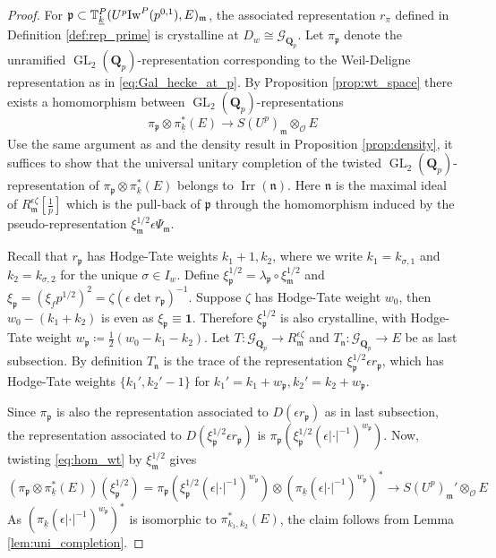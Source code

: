\documentclass[leqno]{amsart}
\theoremstyle{definition}
\theoremstyle{remark}
\newcommand{\id}{\mathbf{1}}
\newcommand{\oo}{\mathcal{O}}
\newcommand{\Qp}{\mathbf{Q}_p}
\DeclareMathOperator{\GL}{GL}
\newcommand{\fm}{\mathfrak{m}}
\newcommand{\fn}{\mathfrak{n}}
\newcommand{\fp}{\mathfrak{p}}
\DeclareMathOperator{\Irr}{Irr}
\newcommand{\Gp}{\mathcal{G}_{\Qp}} %
\newcommand{\wt}[1]{\underline{ #1 }}
\newcommand{\Iw}{\textnormal{Iw}} %
\newcommand{\TT}{\mathbb{T}} %
\begin{document}
\begin{proof}
	For $\fp\subset \TT_{\wt{k}}^P(U^p\Iw^P(p^{0,1}),E)_{\fm}$,
	the associated representation $r_\pi$ defined 
	in Definition \ref{def:rep_prime}
	is crystalline at $D_w\cong \Gp$.
	Let $\pi_{\fp}$ denote the unramified
	$\GL_2(\Qp)$-representation 
	corresponding to the Weil-Deligne representation
	as in \eqref{eq:Gal_hecke_at_p}.
	By Proposition \ref{prop:wt_space} there exists
	a homomorphism between  $\GL_2(\Qp)$-representations
	\begin{equation}\label{eq:hom_wt}
		\pi_\fp\otimes \pi_{\wt{k}}^*(E)\to S(U^p)_\fm\otimes_{\oo}E
	\end{equation}
	Use the same argument as \cite[Thm 3.5.5]{pan}
	and the density result in Proposition \ref{prop:density},
	it suffices to show that
	the universal unitary completion of
	the twisted $\GL_2(\Qp)$-representation
	of $\pi_{\fp}\otimes\pi_{\wt{k}}^*(E)$
	belongs to $\Irr(\fn)$.
	Here $\fn$ is the maximal ideal 
	of  $R_\fm^{\epsilon\zeta}[\frac{1}{p}]$ 
	which is the pull-back of $\fp$
	through the homomorphism induced by
	the pseudo-representation  $\xi_{\fm}^{1/2}\epsilon\Psi_\fm$.

	Recall that $r_\fp$
	has Hodge-Tate weights  $k_1+1,k_2$,
	where we write 
	$k_1=k_{\sigma,1}$ and $k_2=k_{\sigma,2}$
	for the unique $\sigma\in I_w$.
	Define $\xi_\fp^{1/2}=\lambda_\fp\circ \xi_\fm^{1/2}$
	and $\xi_\fp=(\xi_fp^{1/2})^2=\zeta(\epsilon\det r_\fp)^{-1}$.
	Suppose $\zeta$ has Hodge-Tate weight  $w_0$,
	then  $w_0-(k_1+k_2)$ is even as  $\xi_\fp\equiv \id$.
	Therefore  $\xi_{\fp}^{1/2}$
	is also crystalline,
	with Hodge-Tate weight $w_{\fp}\coloneqq \frac{1}{2}(w_0-k_1-k_2)$.
	Let $T\colon \Gp\to R_\fm^{\epsilon\zeta}$ 
	and $T_\fn\colon \Gp\to E$ be as last subsection.
	By definition  $T_\fn$ is the trace of the
	representation
	$\xi_{\fp}^{1/2}\epsilon r_{\fp}$,
	which has Hodge-Tate weights  $\{k_1',k_2'-1\}$ 
	for $k_1'=k_1+w_\fp, k_2'=k_2+w_\fp$.

	Since $\pi_\fp$ is also 
	the representation associated to  
	$D(\epsilon r_\fp)$ as in last subsection,
	the representation
	associated to  $D(\xi_\fp^{1/2}\epsilon r_\fp)$ is
	$\pi_\fp(\xi_\fp^{1/2}(\epsilon|\cdot|^{-1})^{w_\fp})$.
	Now, 
	twisting \eqref{eq:hom_wt} by $\xi_\fm^{1/2}$ gives
	\[
		(\pi_{\fp}\otimes \pi_{\wt{k}}^*(E))(\xi_\fp^{1/2})=
		\pi_\fp(\xi_\fp^{1/2}(\epsilon|\cdot|^{-1})^{w_\fp})
		\otimes (\pi_{\wt{k}}(\epsilon|\cdot|^{-1})^{w_{\fp}})^* \to 
		S(U^p)_\fm'\otimes_{\oo}E
	\]
	As $(\pi_{\wt{k}}(\epsilon|\cdot|^{-1})^{w_{\fp}})^*$
	is isomorphic to $\pi_{k_1,k_2}^*(E)$,
	the claim follows from Lemma \ref{lem:uni_completion}.
\end{proof}
\end{document}
